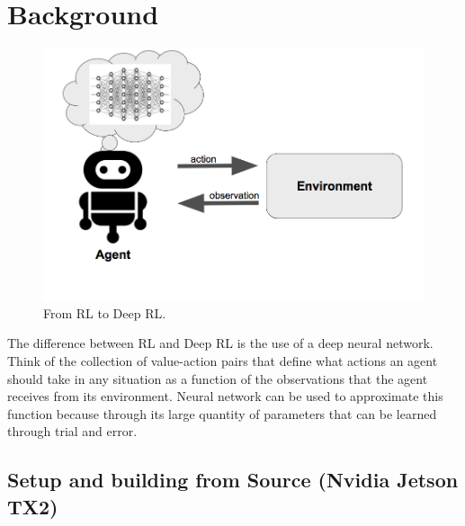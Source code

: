 \documentclass[10pt,journal,compsoc]{IEEEtran}
\begin{document}
\section{Background}
\begin{figure}[thpb]
      \centering
      \includegraphics[width=\linewidth]{FromRLToDeepRL.png}
      \caption{From RL to Deep RL.}
      \label{fig:robot1}
\end{figure}
The difference between RL and Deep RL is the use of a deep neural network. Think of the collection of value-action pairs that define what actions an agent should take in any situation as a function of the observations that the agent receives from its environment. Neural network can be used to approximate this function because through its large quantity of parameters that can be learned through trial and error.
\subsection{Setup and building from Source (Nvidia Jetson TX2)}
\end{document}
